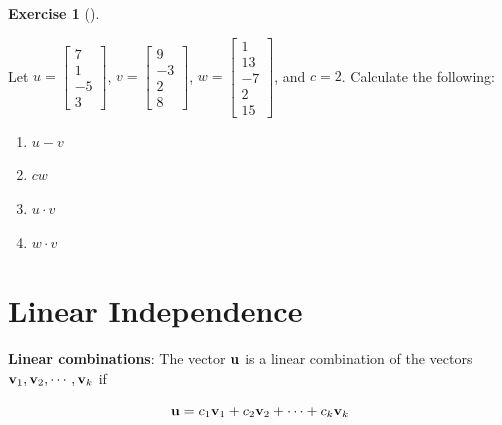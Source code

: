 \documentclass[
  letterpaper,
]{book}
\theoremstyle{definition}
\theoremstyle{definition}
\theoremstyle{plain}
\theoremstyle{definition}
\newtheorem{exercise}{Exercise}[chapter]
\theoremstyle{plain}
\theoremstyle{plain}
\theoremstyle{remark}
\begin{document}
\leavevmode{}%
\begin{exercise}[]\label{exr-vectors1}

Let \(u = \begin{bmatrix} 7\\1\\-5\\3\end{bmatrix}\),
\(v = \begin{bmatrix} 9\\-3\\2\\8 \end{bmatrix}\),
\(w = \begin{bmatrix} 1\\13\\ -7\\2 \\15 \end{bmatrix}\), and \(c = 2\).
Calculate the following:

\begin{enumerate}
\def\labelenumi{\arabic{enumi}.}
\item
  \(u-v\)
\item
  \(cw\)
\item
  \(u \cdot v\)
\item
  \(w \cdot v\)
\end{enumerate}

\end{exercise}

\hypertarget{linearindependence}{%
\section{Linear Independence}\label{linearindependence}}

\textbf{Linear combinations}: The vector \({\bf u}\) is a linear
combination of the vectors \({\bf v}_1, {\bf v}_2, \cdots , {\bf v}_k\)
if

\[{\bf u} = c_1{\bf v}_1 + c_2{\bf v}_2 +  \cdots + c_k{\bf v}_k\]
\end{document}
